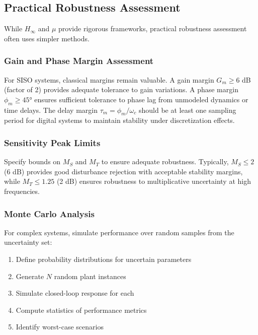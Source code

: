 \subsection{Practical Robustness Assessment}
\label{subsec:practical}

While $H_\infty$ and $\mu$ provide rigorous frameworks, practical robustness assessment often uses simpler methods.

\subsubsection{Gain and Phase Margin Assessment}

For SISO systems, classical margins remain valuable. A gain margin $G_m \geq 6$ dB (factor of 2) provides adequate tolerance to gain variations. A phase margin $\phi_m \geq 45°$ ensures sufficient tolerance to phase lag from unmodeled dynamics or time delays. The delay margin $\tau_m = \phi_m/\omega_c$ should be at least one sampling period for digital systems to maintain stability under discretization effects.

\subsubsection{Sensitivity Peak Limits}

Specify bounds on $M_S$ and $M_T$ to ensure adequate robustness. Typically, $M_S \leq 2$ (6 dB) provides good disturbance rejection with acceptable stability margins, while $M_T \leq 1.25$ (2 dB) ensures robustness to multiplicative uncertainty at high frequencies.

\subsubsection{Monte Carlo Analysis}

For complex systems, simulate performance over random samples from the uncertainty set:
\begin{enumerate}
    \item Define probability distributions for uncertain parameters
    \item Generate $N$ random plant instances
    \item Simulate closed-loop response for each
    \item Compute statistics of performance metrics
    \item Identify worst-case scenarios
\end{enumerate}

